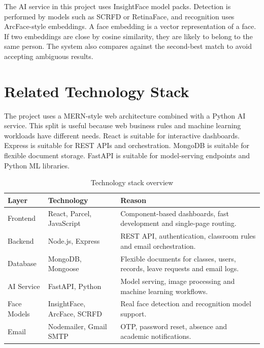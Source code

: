 The AI service in this project uses InsightFace model packs. Detection is performed by models such as SCRFD or RetinaFace, and recognition uses ArcFace-style embeddings. A face embedding is a vector representation of a face. If two embeddings are close by cosine similarity, they are likely to belong to the same person. The system also compares against the second-best match to avoid accepting ambiguous results.

\section{Related Technology Stack}
The project uses a MERN-style web architecture combined with a Python AI service. This split is useful because web business rules and machine learning workloads have different needs. React is suitable for interactive dashboards. Express is suitable for REST APIs and orchestration. MongoDB is suitable for flexible document storage. FastAPI is suitable for model-serving endpoints and Python ML libraries.

\begin{table}[H]
\centering
\caption{Technology stack overview}
\label{tab:stack}
\begin{tabularx}{\textwidth}{p{3.2cm}p{4cm}X}
\toprule
\textbf{Layer} & \textbf{Technology} & \textbf{Reason}\\
\midrule
Frontend & React, Parcel, JavaScript & Component-based dashboards, fast development and single-page routing.\\
Backend & Node.js, Express & REST API, authentication, classroom rules and email orchestration.\\
Database & MongoDB, Mongoose & Flexible documents for classes, users, records, leave requests and email logs.\\
AI Service & FastAPI, Python & Model serving, image processing and machine learning workflows.\\
Face Models & InsightFace, ArcFace, SCRFD & Real face detection and recognition model support.\\
Email & Nodemailer, Gmail SMTP & OTP, password reset, absence and academic notifications.\\
\bottomrule
\end{tabularx}
\end{table}

